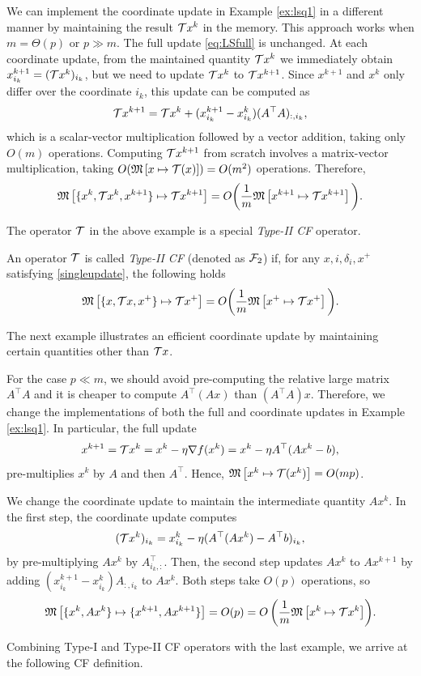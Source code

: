 \begin{example}\label{ex:lsq2}
We can implement the coordinate update in Example \ref{ex:lsq1} in a different manner by maintaining the result ${\mathcal{T}} x^k$ in the memory. This approach works when $m=\Theta(p)$ or $p\gg m$. The full update \eqref{eq:LSfull} is unchanged.
At each coordinate update, from the maintained quantity ${\mathcal{T}} x^k$ we immediately obtain $x_{i_k}^{k+1}=({\mathcal{T}} x^k )_{i_k}$, but we need to update ${\mathcal{T}} x^k$ to ${\mathcal{T}} x^{k+1}$.
Since $x^{k+1}$ and $x^k$ only differ over  the coordinate $i_k$, this update can be computed as  
$${\mathcal{T}} x^{k+1} ={\mathcal{T}} x^k + (x^{k+1}_{i_k}-x^k_{i_k})(A^\top A)_{:,i_k},  $$
which is a scalar-vector multiplication followed by a vector addition, taking only $O(m)$ operations. Computing ${\mathcal{T}} x^{k+1}$ from scratch involves  a matrix-vector multiplication, taking $O(\mathfrak{M}\left[{x}\mapsto {{\mathcal{T}}(x)}\right])=O(m^2)$ operations. 
Therefore,
$$\mathfrak{M}\left[{\{ x^k,{\mathcal{T}} x^k, x^{k+1}\}}\mapsto { {\mathcal{T}}x^{k+1}}\right]= O\bigg(\frac{1}{m}  \mathfrak{M}\left[{x^{k+1}}\mapsto {{\mathcal{T}}x^{k+1}}\right] \bigg).$$
\end{example}
The operator ${\mathcal{T}}$ in the above example is a special \emph{Type-II CF} operator.

\begin{definition}[Type-II CF]
An operator ${\mathcal{T}}$ is called \emph{Type-II CF} (denoted as ${\mathcal{F}}_2$) if, for any $x,i,\delta_i,x^+$ satisfying \eqref{singleupdate}, the following holds
\begin{equation}\label{op-cuf2} \nops{\{ x,\cT x, x^+\}}{ \cT x^+}= O\bigg(\frac{1}{m}\nops{x^+}{\cT x^+}\bigg).
\end{equation}
\end{definition}
The next example illustrates an efficient coordinate update by maintaining certain quantities other than ${\mathcal{T}} x$.
\begin{example}\label{ex:lsq3}
For the case $p\ll m$, we should avoid pre-computing the relative large matrix $A^\top A$ and it is cheaper to compute $A^\top(Ax)$ than $(A^\top A)x$. Therefore, we change the implementations of both the full and coordinate updates in Example \ref{ex:lsq1}. In particular, the full update
$$x^{k+1}={\mathcal{T}} x^k =x^k-\eta\nabla f(x^k)=x^k-\eta A^\top (Ax^k-b),$$
pre-multiplies $x^k$ by $A$ and then $A^\top$. Hence,
$\mathfrak{M}\left[{x^k}\mapsto {{\mathcal{T}}(x^k)}\right]=O(mp)$.

We change the coordinate update to maintain the intermediate quantity $Ax^k$. In the first step, the coordinate update computes
$$({\mathcal{T}} x^k)_{i_k}=x^k_{i_k}-\eta (A^\top (Ax^k)-A^\top b)_{i_k},$$
by pre-multiplying $Ax^k$ by $A^{\top}_{i_k,:}$. Then, the second step updates $Ax^k$ to $Ax^{k+1}$ by adding $(x^{k+1}_{i_k}-x^k_{i_k}) A_{:,i_k}$ to $A x^k$. Both steps take $O(p)$ operations, so
\begin{displaymath}{\nops{\{x^k,Ax^k\}}{\{x^{k+1},Ax^{k+1}\}}=O(p)=O\left(\frac{1}{m}\nops{x^k}{\cT x^k}\right)}.\end{displaymath}
\end{example}
Combining Type-I and Type-II CF operators with the last example, we arrive at the following CF definition.

